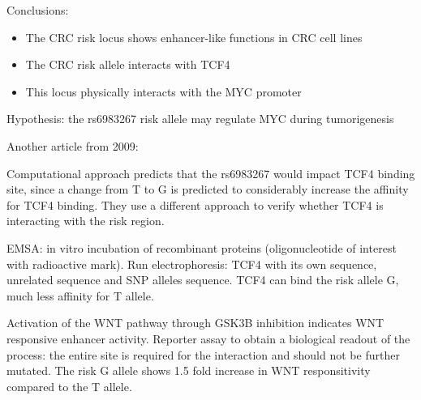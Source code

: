 Conclusions:

\begin{itemize}
\tightlist
\item
  The CRC risk locus shows enhancer-like functions in CRC cell lines
\item
  The CRC risk allele interacts with TCF4
\item
  This locus physically interacts with the MYC promoter
\end{itemize}

Hypothesis: the rs6983267 risk allele may regulate MYC during tumorigenesis

Another article from 2009:

Computational approach predicts that the rs6983267 would impact TCF4 binding site, since a change from T to G is predicted to considerably increase the affinity for TCF4 binding. They use a different approach to verify whether TCF4 is interacting with the risk region.

EMSA: in vitro incubation of recombinant proteins (oligonucleotide of interest with radioactive mark). Run electrophoresis: TCF4 with its own sequence, unrelated sequence and SNP alleles sequence. TCF4 can bind the risk allele G, much less affinity for T allele.

Activation of the WNT pathway through GSK3B inhibition indicates WNT responsive enhancer activity. Reporter assay to obtain a biological readout of the process: the entire site is required for the interaction and should not be further mutated. The risk G allele shows 1.5 fold increase in WNT responsitivity compared to the T allele.
